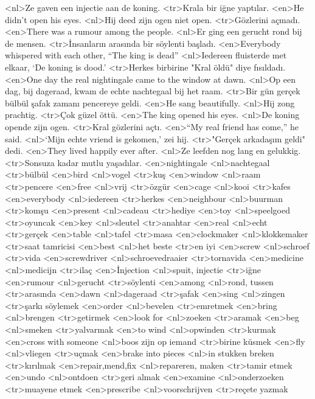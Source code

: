 <nl>Ze gaven een injectie aan de koning.
<tr>Krala bir iğne yaptılar.
<en>He didn’t open his eyes.
<nl>Hij deed zijn ogen niet open.
<tr>Gözlerini açmadı.
<en>There was a rumour among the people.
<nl>Er ging een gerucht rond bij de mensen.
<tr>İnsanların arasında bir söylenti başladı.
<en>Everybody whispered with each other, “The king is dead”
<nl>Iedereen fluisterde met elkaar, `De koning is dood.'
<tr>Herkes birbirine "Kral öldü" diye fısıldadı.
<en>One day the real nightingale came to the window at dawn.
<nl>Op een dag, bij dageraad,  kwam de echte nachtegaal bij het raam.
<tr>Bir gün gerçek bülbül şafak zamanı pencereye geldi.
<en>He sang beautifully.
<nl>Hij zong prachtig.
<tr>Çok güzel öttü.
<en>The king opened his eyes.
<nl>De koning opende zijn ogen.
<tr>Kral gözlerini açtı.
<en>“My real friend has  come,” he said.
<nl>`Mijn echte vriend is gekomen,' zei hij.
<tr>"Gerçek arkadaşım geldi" dedi.
<en>They lived happily ever after.
<nl>Ze leefden nog lang en gelukkig.
<tr>Sonsuza kadar mutlu yaşadılar.
<en>nightingale
<nl>nachtegaal
<tr>bülbül
<en>bird
<nl>vogel
<tr>kuş
<en>window
<nl>raam
<tr>pencere
<en>free
<nl>vrij
<tr>özgür
<en>cage
<nl>kooi
<tr>kafes
<en>everybody
<nl>iedereen
<tr>herkes
<en>neighbour
<nl>buurman
<tr>komşu
<en>present
<nl>cadeau
<tr>hediye
<en>toy
<nl>speelgoed
<tr>oyuncak
<en>key
<nl>sleutel
<tr>anahtar
<en>real
<nl>echt
<tr>gerçek
<en>table
<nl>tafel
<tr>masa
<en>clockmaker
<nl>klokkemaker
<tr>saat tamricisi
<en>best
<nl>het beste
<tr>en iyi
<en>screw
<nl>schroef
<tr>vida
<en>screwdriver
<nl>schroevedraaier
<tr>tornavida
<en>medicine
<nl>medicijn
<tr>ilaç
<en>İnjection
<nl>spuit, injectie
<tr>iğne
<en>rumour
<nl>gerucht
<tr>söylenti
<en>among
<nl>rond, tussen
<tr>arasında
<en>dawn
<nl>dageraad
<tr>şafak
<en>sing
<nl>zingen
<tr>şarkı söylemek
<en>order
<nl>bevelen
<tr>emretmek
<en>bring
<nl>brengen
<tr>getirmek
<en>look for
<nl>zoeken
<tr>aramak
<en>beg
<nl>smeken
<tr>yalvarmak
<en>to wind
<nl>opwinden
<tr>kurmak
<en>cross with someone
<nl>boos zijn op iemand
<tr>birine küsmek
<en>fly
<nl>vliegen
<tr>uçmak
<en>brake into pieces
<nl>in stukken breken
<tr>kırılmak
<en>repair,mend,fix
<nl>repareren, maken
<tr>tamir etmek
<en>undo
<nl>ontdoen 
<tr>geri almak
<en>examine
<nl>onderzoeken
<tr>muayene etmek
<en>prescribe
<nl>voorschrijven
<tr>reçete yazmak
